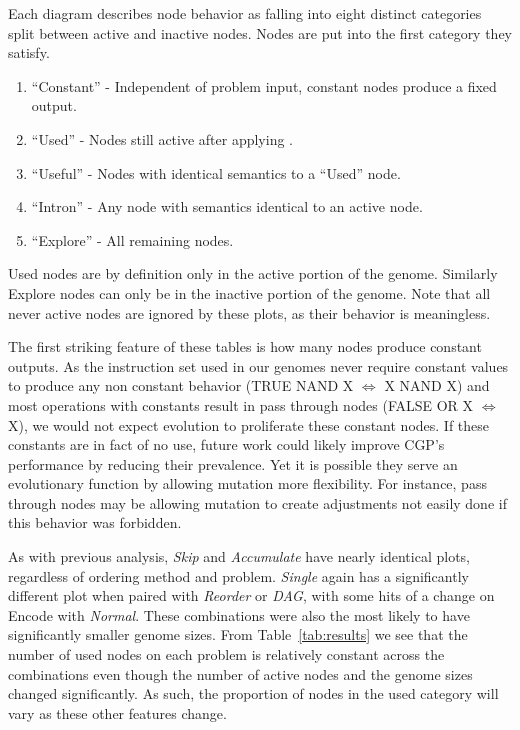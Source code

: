 \documentclass[journal]{IEEEtran}
\begin{document}
Each diagram describes node behavior as falling into eight distinct categories
split between active and inactive nodes.  Nodes are put into the first category
they satisfy.
\begin{enumerate}
\item ``Constant'' - Independent of problem input, constant nodes produce a fixed output.
\item ``Used'' - Nodes still active after applying .
\item ``Useful'' - Nodes with identical semantics to a ``Used'' node.
\item ``Intron'' - Any node with semantics identical to an active node.
\item ``Explore'' - All remaining nodes.
\end{enumerate}
Used nodes are by definition only in the active portion of the genome.  Similarly
Explore nodes can only be in the inactive portion of the genome.   Note that
all never active nodes are ignored by these plots, as their behavior is meaningless.

The first striking feature of these tables is how many nodes produce constant
outputs.  As the instruction set used in our genomes never require constant values
to produce any non constant behavior (TRUE NAND X $\Leftrightarrow$ X NAND X)
and most operations with constants result in pass through nodes
(FALSE OR X $\Leftrightarrow$ X), we would not expect evolution to proliferate
these constant nodes.  If these constants are in fact of no use, future work
could likely improve CGP's performance by reducing their prevalence.  Yet
it is possible they serve an evolutionary function by allowing mutation more
flexibility.  For instance, pass through nodes may be allowing mutation to create
adjustments not easily done if this behavior was forbidden.

As with previous analysis, \emph{Skip} and \emph{Accumulate} have nearly identical
plots, regardless of ordering method and problem.  \emph{Single} again has
a significantly different plot when paired with \emph{Reorder} or \emph{DAG},
with some hits of a change on Encode with \emph{Normal}.  These combinations
were also the most likely to have significantly smaller genome sizes.  From
Table~\ref{tab:results} we see that the number of used nodes on each problem is relatively
constant across the combinations even though the number of active nodes and the
genome sizes changed significantly.  As such, the proportion of nodes in the
used category will vary as these other features change.
\end{document}
